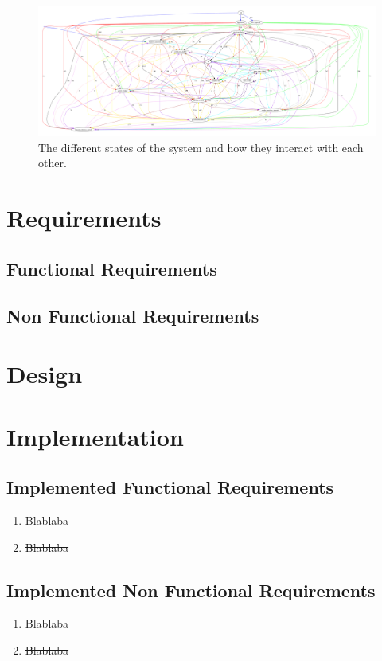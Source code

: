     \begin{figure}[H]
        \includegraphics[width=5in]{image/statesInteractionFalse-gvfile.pdf}
        \centering
        \caption[States in session and how they interact]{The different states of the system and how they interact with each other.}
        \label{figure:statesInteractions}
    \end{figure}

\chapter{Requirements}\label{app:req}

\section{Functional Requirements}

\section{Non Functional Requirements}

\chapter{Design}\label{app:des}

\chapter{Implementation}\label{app:impl}
\section{Implemented Functional Requirements}
\begin{enumerate}[label=\bfseries FR \arabic*:]
  \item {\color{ForestGreen}Blablaba}
  \item {\color{RedOrange}\st{Blablaba}}
\end{enumerate}

\section{Implemented Non Functional Requirements}
\begin{enumerate}[label=\bfseries NFR \arabic*:]
  \item {\color{ForestGreen}Blablaba}
  \item {\color{RedOrange}\st{Blablaba}}
\end{enumerate}

